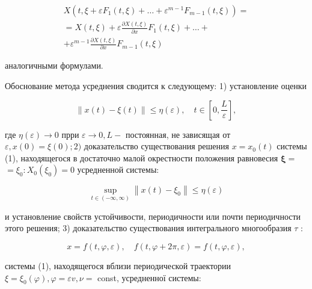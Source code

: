 \documentclass[10pt]{article}
\begin{document}
\[

\begin{gathered}

X\left(t, \xi+\varepsilon F_{1}(t, \xi)+\ldots+\varepsilon^{m-1} F_{m-1}(t, \xi)\right)= \\

=X(t, \xi)+\varepsilon \frac{\partial X(t, \xi)}{\partial x} F_{1}(t, \xi)+\ldots+ \\

+\varepsilon^{m-1} \frac{\partial X(t, \xi)}{\partial x} F_{m-1}(t, \xi)

\end{gathered}

\]



аналогичными формулами.



Обоснование метода усреднения сводится к следующему: 1) установление оценки



\[

\|x(t)-\xi(t)\| \leqslant \eta(\varepsilon), \quad t \in\left[0, \frac{L}{\varepsilon}\right],

\]



где $\eta(\varepsilon) \rightarrow 0$ прри $\varepsilon \rightarrow 0, L-$ постоянная, не зависящая от $\varepsilon, x(0)=\xi(0) ; 2)$ доказательство существования решения $x=x_{0}(t)$ системы (1), находящегося в достаточно малой окрестности положения равновесия $\boldsymbol{\xi}=$ $=\xi_{0}: X_{0}\left(\xi_{0}\right)=0$ усредненной системы:



\[

\sup _{t \in(-\infty, \infty)}\left\|x(t)-\xi_{0}\right\| \leqslant \eta(\varepsilon)

\]



и установление свойств устойчивости, периодичности или почти периодичности этого решения; 3) доказательство существования интегрального многообразия $\tau$ :



\[

x=f(t, \varphi, \varepsilon), \quad f(t, \varphi+2 \pi, \varepsilon)=f(t, \varphi, \varepsilon),

\]



системы (1), находящегося вблизи периодической траектории $\xi=\xi_{0}(\varphi), \varphi=\varepsilon v, \nu=$ const, усредненної системы:
\end{document}
